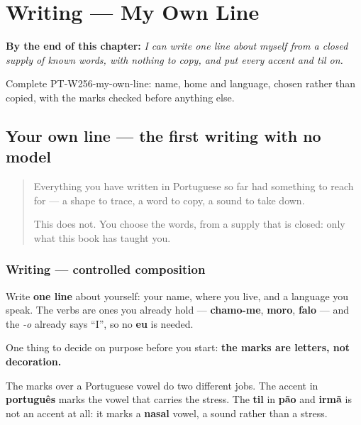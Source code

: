 
\chapter{Writing --- My Own Line}
\label{ch:pt-my-own-line}

\begin{chapteropening}
\textbf{By the end of this chapter:} \emph{I can write one line about myself from a closed supply of known words, with nothing to copy, and put every accent and til on.}

Complete PT-W256-my-own-line: name, home and language, chosen rather than copied, with the marks checked before anything else.
\end{chapteropening}

\section[(my own line)]{Your own line — the first writing with no model}

\label{lesson:PT-W256-my-own-line}



\begin{quote}
Everything you have written in Portuguese so far had something to reach for — a shape to trace, a word to copy, a sound to take down.

This does not. You choose the words, from a supply that is closed: only what this book has taught you.
\end{quote}

\subsection*{Writing — controlled composition}
Write \textbf{one line} about yourself: your name, where you live, and a language you speak. The verbs are ones you already hold — \textbf{chamo-me}, \textbf{moro}, \textbf{falo} — and the \emph{-o} already says \textquotedblleft{}I\textquotedblright{}, so no \textbf{eu} is needed.

One thing to decide on purpose before you start: \textbf{the marks are letters, not decoration.}

The marks over a Portuguese vowel do two different jobs. The accent in \textbf{português} marks the vowel that carries the stress. The \textbf{til} in \textbf{pão} and \textbf{irmã} is not an accent at all: it marks a \textbf{nasal} vowel, a sound rather than a stress.

